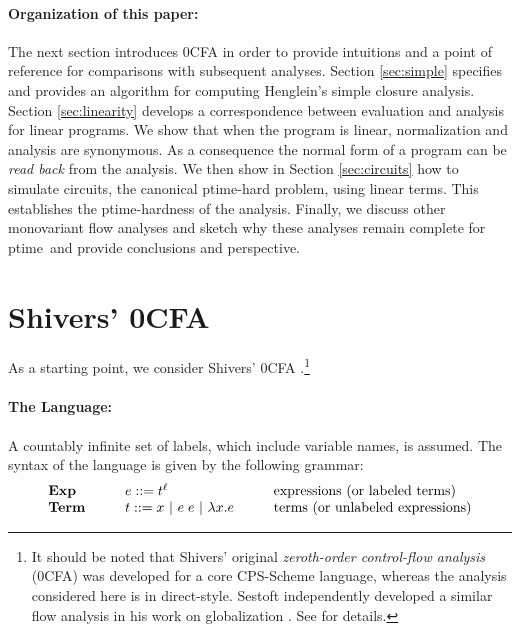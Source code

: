 \documentclass{llncs}
\newcommand\ptime{{\sc ptime}}
\newcommand\Term{\mathbf{Term}}
\newcommand\Exp{\mathbf{Exp}}
\begin{document}
\paragraph{Organization of this paper:}

The next section introduces 0CFA in order to provide intuitions and a
point of reference for comparisons with subsequent analyses.  Section
\ref{sec:simple} specifies and provides an algorithm for computing
Henglein's simple closure analysis. Section \ref{sec:linearity}
develops a correspondence between evaluation and analysis for linear
programs.  We show that when the program is linear, normalization
and analysis are synonymous.  As a consequence the normal form of a
program can be {\em read back} from the analysis.  We then show in
Section \ref{sec:circuits} how to simulate circuits, the canonical
\ptime-hard problem, using linear terms.  This establishes the
\ptime-hardness of the analysis.  Finally, we discuss other
monovariant flow analyses and sketch why these analyses remain
complete for \ptime\ and provide conclusions and perspective.


\section{Shivers' 0CFA}
\label{sec:0cfa}

As a starting point, we consider Shivers' 0CFA
\cite{shivers-88,shivers-phd}.\footnote{It should be noted that
Shivers' original {\em zeroth-order control-flow analysis} (0CFA) was
developed for a core CPS-Scheme language, whereas the analysis
considered here is in direct-style.  Sestoft independently developed a
similar flow analysis in his work on globalization
\cite{sestoft-88,sestoft-89}.  See \cite{midtgaard-07,mossin-phd} for
details.}

\paragraph{The Language:} 
A countably infinite set of labels, which include variable names, is
assumed.  The syntax of the language is given by the following
grammar:
\begin{displaymath}
\begin{array}{l@{\hspace{1cm}}l@{\hspace{1cm}}l}
\Exp & e ::= t^\ell & \mbox{expressions (or labeled terms)}\\
\Term & t ::= x\ |\ e\;e\ |\ \lambda x.e & \mbox{terms (or unlabeled expressions)}
\end{array}
\end{displaymath}
\end{document}
